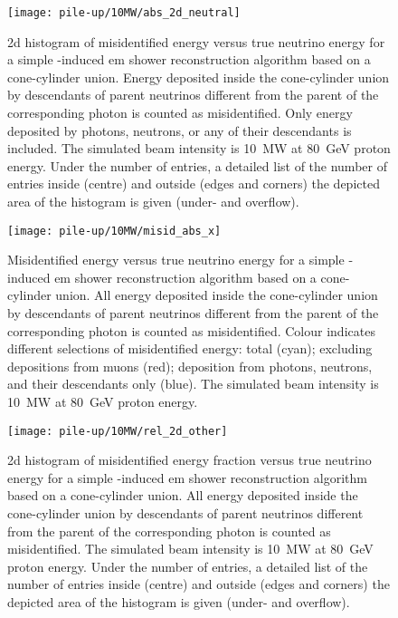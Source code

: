 \begin{figure}[htb]
	\centering
	\texttt{[image: pile-up/10MW/abs\_2d\_neutral]}
	\caption{\gls{2d} histogram of misidentified energy versus true neutrino energy for a simple \Pgpz-induced \gls{em} shower reconstruction algorithm based on a cone-cylinder union.
		Energy deposited inside the cone-cylinder union by descendants of parent neutrinos different from the parent of the corresponding \Pgpz photon is counted as misidentified.
		Only energy deposited by photons, neutrons, or any of their descendants is included.
		The simulated beam intensity is \SI{10}{\mega\watt} at \SI{80}{\giga\electronvolt} proton energy.
		Under the number of entries, a detailed list of the number of entries inside (centre) and outside (edges and corners) the depicted area of the histogram is given (under- and overflow).}
\end{figure}

\begin{figure}[htb]
	\centering
	\texttt{[image: pile-up/10MW/misid\_abs\_x]}
	\caption{Misidentified energy versus true neutrino energy for a simple \Pgpz-induced \gls{em} shower reconstruction algorithm based on a cone-cylinder union.
		All energy deposited inside the cone-cylinder union by descendants of parent neutrinos different from the parent of the corresponding \Pgpz photon is counted as misidentified.
		Colour indicates different selections of misidentified energy: total (cyan); excluding depositions from muons (red); deposition from photons, neutrons, and their descendants only (blue).
		The simulated beam intensity is \SI{10}{\mega\watt} at \SI{80}{\giga\electronvolt} proton energy.}
\end{figure}

\begin{figure}[htb]
	\centering
	\texttt{[image: pile-up/10MW/rel\_2d\_other]}
	\caption{\gls{2d} histogram of misidentified energy fraction versus true neutrino energy for a simple \Pgpz-induced \gls{em} shower reconstruction algorithm based on a cone-cylinder union.
		All energy deposited inside the cone-cylinder union by descendants of parent neutrinos different from the parent of the corresponding \Pgpz photon is counted as misidentified.
		The simulated beam intensity is \SI{10}{\mega\watt} at \SI{80}{\giga\electronvolt} proton energy.
		Under the number of entries, a detailed list of the number of entries inside (centre) and outside (edges and corners) the depicted area of the histogram is given (under- and overflow).}
\end{figure}

